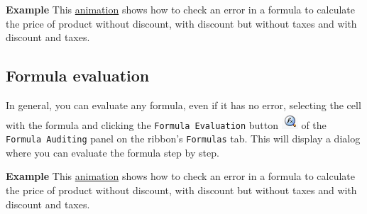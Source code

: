 \textbf{Example} This \href{http://aprendeconalf.es/office/excel/manual/img/example_error_checking.gif}{animation} shows how to check an error in a formula to calculate the price of product without discount, with discount but without taxes and with discount and taxes.

\subsection{Formula evaluation}\hypertarget{a-nameformulaevaluationaformula-evaluation}{}\label{a-nameformulaevaluationaformula-evaluation}

In general, you can evaluate any formula, even if it has no error, selecting the cell with the formula and clicking the
\texttt{Formula Evaluation} button \includegraphics[scale=0.7]{../img/button_evaluate_formula.png} of the
\texttt{Formula Auditing} panel on the ribbon's \texttt{Formulas} tab. This will display a dialog where you can evaluate the formula step by step.

\textbf{Example} This \href{http://aprendeconalf.es/office/excel/manual/img/example_formula_evaluation.gif}{animation} shows how to check an error in a formula to calculate the price of product without discount, with discount but without taxes and with discount and taxes.

